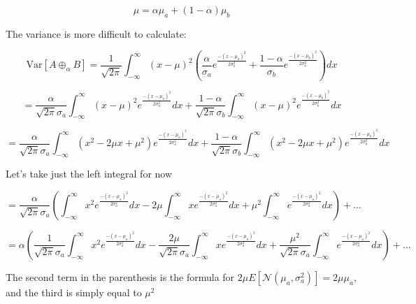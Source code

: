 \documentclass{article}
\newcommand{\Var}{\mathrm{Var}}
\begin{document}
\begin{equation}
    \mu = \alpha \mu_a + (1-\alpha)\mu_b
\end{equation}

The variance is more difficult to calculate:

\begin{equation}
     \Var\left[A\oplus_\alpha B \right]= \frac{1}{\sqrt{2\pi}} \int_{-\infty}^{\infty} (x-\mu)^2 \left( \frac{\alpha}{\sigma_a} e^{\frac{-(x-\mu_a)^2}{2\sigma_a^2}} + \frac{1-\alpha}{\sigma_b}e^{\frac{-(x-\mu_b)^2}{2\sigma_b^2}} \right) dx
\end{equation}

\begin{equation}
     = \frac{\alpha}{\sqrt{2\pi}\sigma_a} \int_{-\infty}^{\infty} (x-\mu)^2 e^{\frac{-(x-\mu_a)^2}{2\sigma_a^2}} dx + \frac{1-\alpha}{\sqrt{2\pi}\sigma_b}\int_{-\infty}^{\infty}(x-\mu)^2 e^{\frac{-(x-\mu_b)^2}{2\sigma_b^2}} dx
\end{equation}

\begin{equation}
     = \frac{\alpha}{\sqrt{2\pi}\sigma_a} \int_{-\infty}^{\infty} (x^2-2\mu x+\mu^2) e^{\frac{-(x-\mu_a)^2}{2\sigma_a^2}} dx + \frac{1-\alpha}{\sqrt{2\pi}\sigma_b}\int_{-\infty}^{\infty}(x^2-2\mu x + \mu^2) e^{\frac{-(x-\mu_b)^2}{2\sigma_b^2}} dx
\end{equation}

Let's take just the left integral for now

\begin{equation}
     = \frac{\alpha}{\sqrt{2\pi}\sigma_a} \left( \int_{-\infty}^{\infty} x^2 e^{\frac{-(x-\mu_a)^2}{2\sigma_a^2}} dx - 2\mu \int_{-\infty}^{\infty} x e^{\frac{-(x-\mu_a)^2}{2\sigma_a^2}} dx + \mu^2 \int_{-\infty}^{\infty} e^{\frac{-(x-\mu_a)^2}{2\sigma_a^2}} dx \right) + \ldots
\end{equation}

\begin{equation}
     = \alpha \left( \frac{1}{\sqrt{2\pi}\sigma_a} \int_{-\infty}^{\infty} x^2 e^{\frac{-(x-\mu_a)^2}{2\sigma_a^2}} dx - \frac{2\mu}{\sqrt{2\pi}\sigma_a}  \int_{-\infty}^{\infty} x e^{\frac{-(x-\mu_a)^2}{2\sigma_a^2}} dx + \frac{\mu^2}{\sqrt{2\pi}\sigma_a}  \int_{-\infty}^{\infty} e^{\frac{-(x-\mu_a)^2}{2\sigma_a^2}} dx \right) + \ldots
\end{equation}

The second term in the parenthesis is the formula for $2\mu E[\mathcal{N}(\mu_a, \sigma_a^2)] = 2\mu\mu_a$, and the third is simply equal to $\mu^2$
\end{document}
